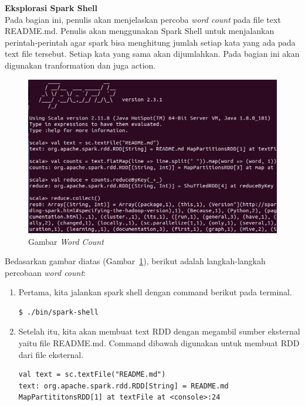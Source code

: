 \documentclass[a4paper,twoside]{article}
\begin{document}
\begin{enumerate}
\begin{enumerate}
\end{enumerate}


\textbf{Eksplorasi Spark Shell}\\

Pada bagian ini, penulis akan menjelaskan percoba \textit{word count} pada file text README.md. Penulis akan menggunakan Spark Shell untuk menjalankan perintah-perintah agar spark bisa menghitung jumlah setiap kata yang ada pada text file tersebut. Setiap kata yang sama akan dijumlahkan. Pada bagian ini akan digunakan tranformation dan juga action.

\begin{figure}[H]
    \centering  
    \includegraphics[scale=0.6]{wordcount}  
    \caption[Gambar {\it Word Count} ]{Gambar {\it Word Count}} 
    \label{fig:wordcount} 
\end{figure}

Bedasarkan gambar diatas (Gambar~\ref{fig:wordcount}), berikut adalah langkah-langkah percobaan  \textit{word count}:

\begin{enumerate}

\item Pertama, kita jalankan spark shell dengan command berikut pada terminal.

\begin{verbatim}
$ ./bin/spark-shell
\end{verbatim}

\item Setelah itu, kita akan membuat text RDD dengan megambil sumber eksternal yaitu file README.md. Command dibawah digunakan untuk membuat RDD dari file eksternal.

\begin{verbatim}
val text = sc.textFile("README.md") 
text: org.apache.spark.rdd.RDD[String] = README.md MapPartititonsRDD[1] at textFile at <console>:24
\end{verbatim}


\end{enumerate}
\end{enumerate}
\end{document}
